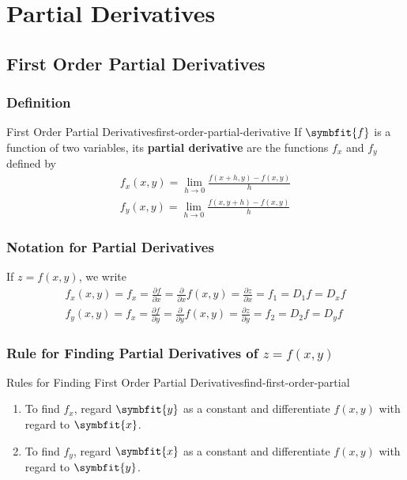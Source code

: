 \documentclass[math,code]{amznotes}
\theoremstyle{remark}
\begin{document}
\section{Partial Derivatives}
\subsection{First Order Partial Derivatives}
\subsubsection{Definition}
\begin{dfnbox}{First Order Partial Derivatives}{first-order-partial-derivative}
    If $\symbfit{f}$ is a function of two variables, its {\color{red} \textbf{partial derivative}} are the functions $f_x$ and $f_y$ defined by
    \begin{gather*}
        f_x(x,y)=\lim\limits_{h \to 0} \frac{f(x+h,y)-f(x,y)}{h} \\
        f_y(x,y)=\lim\limits_{h \to 0} \frac{f(x,y+h)-f(x,y)}{h}
    \end{gather*}
\end{dfnbox}
\subsubsection{Notation for Partial Derivatives}
If $z=f(x,y)$, we write
\begin{gather*}
    f_x(x,y)=f_x=\frac{\partial f}{\partial x}=\frac{\partial}{\partial x}f(x,y)=\frac{\partial z}{\partial x}=f_1=D_1f=D_xf \\
    f_y(x,y)=f_x=\frac{\partial f}{\partial y}=\frac{\partial}{\partial y}f(x,y)=\frac{\partial z}{\partial y}=f_2=D_2f=D_yf
\end{gather*}
\subsubsection{Rule for Finding Partial Derivatives of $z=f(x,y)$}
\begin{thmbox}{Rules for Finding First Order Partial Derivatives}{find-first-order-partial}
    \begin{enumerate}
        \item To find $f_x$, regard $\symbfit{y}$ as a constant and differentiate $f(x,y)$ with regard to $\symbfit{x}$.
        \item To find $f_y$, regard $\symbfit{x}$ as a constant and differentiate $f(x,y)$ with regard to $\symbfit{y}$.
    \end{enumerate}
\end{thmbox}
\end{document}
